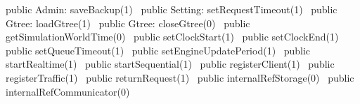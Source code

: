 public \LA{}Admin: saveBackup(1)~{\nwtagstyle{}}\RA{}
public \LA{}Setting: setRequestTimeout(1)~{\nwtagstyle{}}\RA{}
public \LA{}Gtree: loadGtree(1)~{\nwtagstyle{}}\RA{}
public \LA{}Gtree: closeGtree(0)~{\nwtagstyle{}}\RA{}
public \LA{}getSimulationWorldTime(0)~{\nwtagstyle{}}\RA{}
public \LA{}setClockStart(1)~{\nwtagstyle{}}\RA{}
public \LA{}setClockEnd(1)~{\nwtagstyle{}}\RA{}
public \LA{}setQueueTimeout(1)~{\nwtagstyle{}}\RA{}
public \LA{}setEngineUpdatePeriod(1)~{\nwtagstyle{}}\RA{}
public \LA{}startRealtime(1)~{\nwtagstyle{}}\RA{}
public \LA{}startSequential(1)~{\nwtagstyle{}}\RA{}
public \LA{}registerClient(1)~{\nwtagstyle{}}\RA{}
public \LA{}registerTraffic(1)~{\nwtagstyle{}}\RA{}
public \LA{}returnRequest(1)~{\nwtagstyle{}}\RA{}
public \LA{}internalRefStorage(0)~{\nwtagstyle{}}\RA{}
public \LA{}internalRefCommunicator(0)~{\nwtagstyle{}}\RA{}
\nwendcode{}\nwdocspar

